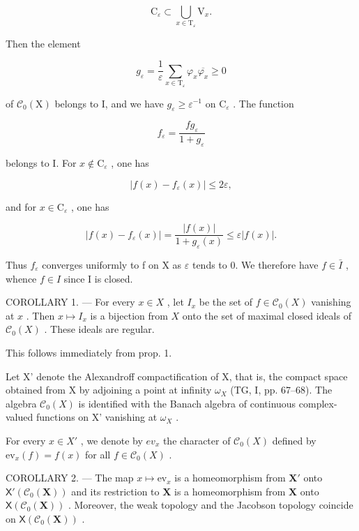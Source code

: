 \[
\mathrm{C} _ {\varepsilon} \subset \bigcup_ {x \in \mathrm{T} _ {\varepsilon}} \mathrm{V} _ {x}.
\]

Then the element

\[
g _ {\varepsilon} = \frac {1}{\varepsilon} \sum_ {x \in \mathrm{T} _ {\varepsilon}} \varphi_ {x} \overline {{\varphi_ {x}}} \geqslant 0
\]

of \(\mathcal{C}_0(\mathrm{X})\) belongs to I, and we have \(g_{\varepsilon} \geqslant \varepsilon^{-1}\) on \(\mathrm{C}_{\varepsilon}\) . The function

\[
f _ {\varepsilon} = \frac {f g _ {\varepsilon}}{1 + g _ {\varepsilon}}
\]

belongs to I. For \(x \notin \mathrm{C}_{\varepsilon}\) , one has

\[
\left| f (x) - f _ {\varepsilon} (x) \right| \leqslant 2 \varepsilon ,
\]

and for \(x\in \mathrm{C}_{\varepsilon}\) , one has

\[
| f (x) - f _ {\varepsilon} (x) | = \frac {| f (x) |}{1 + g _ {\varepsilon} (x)} \leqslant \varepsilon | f (x) |.
\]

Thus \(f_{\varepsilon}\) converges uniformly to f on X as \(\varepsilon\) tends to 0. We therefore have \(f \in \bar{I}\) , whence \(f \in I\) since I is closed.

COROLLARY 1. --- For every \(x \in X\) , let \(I_x\) be the set of \(f \in \mathcal{C}_0(X)\) vanishing at \(x\) . Then \(x \mapsto I_x\) is a bijection from \(X\) onto the set of maximal closed ideals of \(\mathcal{C}_0(X)\) . These ideals are regular.

This follows immediately from prop. 1.

Let X' denote the Alexandroff compactification of X, that is, the compact space obtained from X by adjoining a point at infinity \(\omega_{X}\) (TG, I, pp. 67–68). The algebra \(\mathcal{C}_{0}(X)\) is identified with the Banach algebra of continuous complex-valued functions on X' vanishing at \(\omega_{X}\) .

For every \(x \in X'\) , we denote by \(ev_{x}\) the character of \(\mathcal{C}_{0}(X)\) defined by \(\mathrm{ev}_{x}(f) = f(x)\) for all \(f \in \mathcal{C}_{0}(X)\) .

COROLLARY 2. --- The map \(x \mapsto \mathrm{ev}_x\) is a homeomorphism from \(\mathbf{X}'\) onto \(\mathsf{X}'(\mathcal{C}_0(\mathbf{X}))\) and its restriction to \(\mathbf{X}\) is a homeomorphism from \(\mathbf{X}\) onto \(\mathsf{X}(\mathcal{C}_0(\mathbf{X}))\) . Moreover, the weak topology and the Jacobson topology coincide on \(\mathsf{X}(\mathcal{C}_0(\mathbf{X}))\) .

